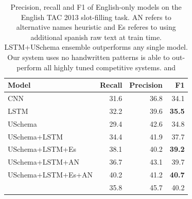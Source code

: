 \begin{table}[tb]
\begin{center}
\caption{Precision, recall and F1 of English-only models on the English TAC 2013 slot-filling task. AN refers to alternative names heuristic and Es referes to using additional spanish raw text at train time. LSTM+USchema ensemble outperforms any single model. Our system uses no handwritten patterns is able to out-perform all highly tuned competitive systems. \protect\citet{roth2014relationfactory} and \protect\citet{angeli2014stanford} %
\label{en-tac-table}}
\begin{tabular}{|lrrr|}
\hline
\bf Model & \bf Recall & \bf Precision & \bf F1 \\
\hline\hline
CNN                 & 31.6 & 36.8 & 34.1 \\
LSTM                & 32.2 & 39.6 & \bf 35.5  \\
USchema             & 29.4 & 42.6 & 34.8 \\
\hline\hline
USchema+LSTM        & 34.4 & 41.9 & 37.7 \\
USchema+LSTM+Es        & 38.1 & 40.2 & \bf 39.2 \\
\hline\hline
USchema+LSTM+AN	& 36.7 & 43.1 & 39.7 \\
USchema+LSTM+Es+AN & 40.2 & 41.2 & \bf 40.7 \\
\citet{roth2014relationfactory} & 35.8 & 45.7 & 40.2 \\

\hline
\end{tabular}
\end{center}
\end{table}

